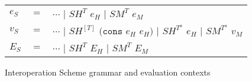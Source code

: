 \begin{figure}[p]
\centering
\begin{tabular}{lcl}
\vspace{5pt}

$e_{S}$ & $=$ & $\cdots$ $\vert$ $SH^{T}$ $e_{H}$ $\vert$ $SM^{T}$ $e_{M}$ \\

\vspace{5pt}

$v_{S}$ & $=$ & $\cdots$ $\vert$ $SH^{[T]}$ $(\mathtt{cons}$ $e_{H}$ $e_{H})$ $\vert$ $SH^{T^{a}}$ $e_{H}$ $\vert$ $SM^{T^{a}}$ $v_{M}$ \\

\vspace{5pt}

$E_{S}$ & $=$ & $\cdots$ $\vert$ $SH^{T}$ $E_{H}$ $\vert$ $SM^{T}$ $E_{M}$
\end{tabular}
\caption{Interoperation Scheme grammar and evaluation contexts}
\label{isg}
\end{figure}